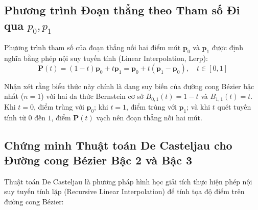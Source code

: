 \subsection{Phương trình Đoạn thẳng theo Tham số Đi qua \texorpdfstring{$p_0, p_1$}{p0, p1}}

Phương trình tham số của đoạn thẳng nối hai điểm mút $\mathbf{p}_0$ và $\mathbf{p}_1$ được định nghĩa bằng phép nội suy tuyến tính (Linear Interpolation, Lerp):
\begin{equation}
\mathbf{P}(t) = (1 - t) \mathbf{p}_0 + t \mathbf{p}_1 = \mathbf{p}_0 + t(\mathbf{p}_1 - \mathbf{p}_0), \quad t \in [0, 1]
\end{equation}

Nhận xét rằng biểu thức này chính là dạng suy biến của đường cong Bézier bậc nhất ($n = 1$) với hai đa thức Bernstein cơ sở $B_{0, 1}(t) = 1 - t$ và $B_{1, 1}(t) = t$. Khi $t = 0$, điểm trùng với $\mathbf{p}_0$; khi $t = 1$, điểm trùng với $\mathbf{p}_1$; và khi $t$ quét tuyến tính từ $0$ đến $1$, điểm $\mathbf{P}(t)$ vạch nên đoạn thẳng nối hai mút.

\subsection{Chứng minh Thuật toán De Casteljau cho Đường cong Bézier Bậc 2 và Bậc 3}
\label{subsec:w5_decasteljau}

Thuật toán De Casteljau là phương pháp hình học giải tích thực hiện phép nội suy tuyến tính lặp (Recursive Linear Interpolation) để tính tọa độ điểm trên đường cong Bézier:

